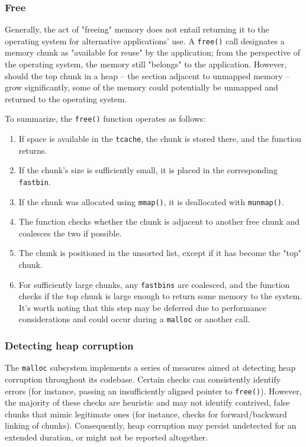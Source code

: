\documentclass{article}
\begin{document}
\subsubsection{Free} Generally, the act of "freeing" memory does not entail
returning it to the operating system for alternative applications' use. A
\texttt{free()} call designates a memory chunk as "available for reuse" by the
application; from the perspective of the operating system, the memory still
"belongs" to the application. However, should the top chunk in a heap -- the
section adjacent to unmapped memory -- grow significantly, some of the memory
could potentially be unmapped and returned to the operating system.

To summarize, the \texttt{free()} function operates as follows:

\begin{enumerate}
\item If space is available in the \texttt{tcache}, the chunk is stored there,
and the function returns.

\item If the chunk's size is sufficiently small, it is placed in the
corresponding \texttt{fastbin}.

\item If the chunk was allocated using \texttt{mmap()}, it is deallocated with
\texttt{munmap()}.

\item The function checks whether the chunk is adjacent to another free chunk
and coalesces the two if possible.

\item The chunk is positioned in the unsorted list, except if it has become the
"top" chunk.

\item For sufficiently large chunks, any \texttt{fastbins} are coalesced, and
the function checks if the top chunk is large enough to return some memory to
the system. It's worth noting that this step may be deferred due to performance
considerations and could occur during a \texttt{malloc} or another call.
\end{enumerate}

\subsubsection{Detecting heap corruption}
The \texttt{malloc} subsystem implements a series of measures aimed at detecting
heap corruption throughout its codebase. Certain checks can consistently
identify errors (for instance, passing an insufficiently aligned pointer to
\texttt{free()}). However, the majority of these checks are heuristic and may
not identify contrived, false chunks that mimic legitimate ones (for instance,
checks for forward/backward linking of chunks). Consequently, heap corruption
may persist undetected for an extended duration, or might not be reported
altogether.
\end{document}
